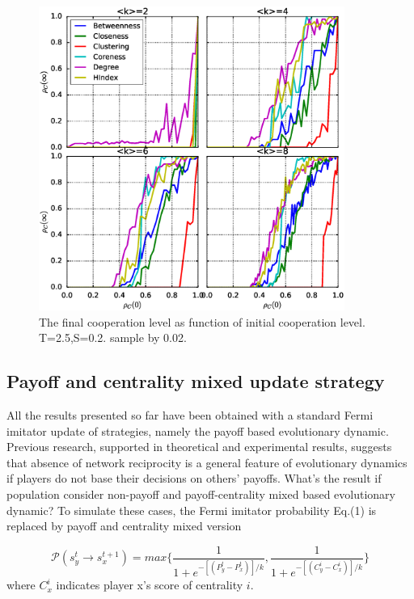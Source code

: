 \documentclass[preprint,12pt,3p]{elsarticle}
\begin{document}
\begin{figure}[htbp]
\centering
\includegraphics[width=10cm]{init_vs_stable_coop_density.eps}

\caption{The final cooperation level as function of initial cooperation level.
T=2.5,S=0.2. sample by 0.02. }
\label{InitVsFinalCoopLevel}
\end{figure}



\subsection{Payoff and centrality mixed update strategy} %
    All the results presented so far have been obtained with a standard Fermi imitator
update of strategies, namely the payoff based evolutionary dynamic.
Previous research, supported in theoretical\cite{CiminiSanchez-18359} and experimental\cite{Gracia-LázaroCuesta-18325} results, suggests that absence of network reciprocity is a general feature of evolutionary dynamics if players do not base their decisions on others’ payoffs.
What's the result if population consider non-payoff and payoff-centrality mixed based evolutionary dynamic?
    To simulate these cases, the Fermi imitator probability Eq.(1) is replaced by
payoff and centrality mixed version

\begin{equation}
\mathcal{P}(s_y^t\rightarrow s_x^{t+1})=max\{ \frac{1}{1+e^{-[(P_y^t-P_x^t)]/k}},\frac{1}{1+e^{-[(C^i_y-C^i_x)]/k} }\}
\label{eq_mixedFermi}
\end{equation}
where $C^i_x$ indicates player x's score of centrality $i$.
\end{document}
